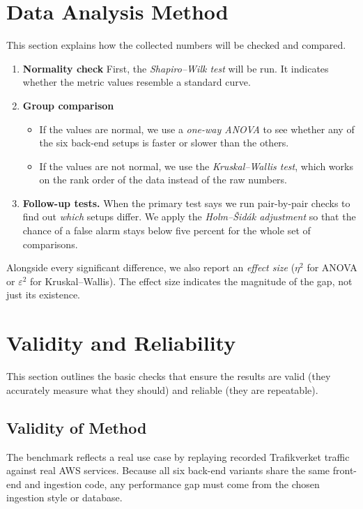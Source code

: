 \documentclass[nomenclature, english, biblatex]{kththesis}
\numberwithin{listing}{chapter}
\begin{document}
\section{Data Analysis Method}
\label{sec:analysis}

This section explains how the collected numbers will be
checked and compared.

\begin{enumerate}[label=\arabic*., leftmargin=*]
  \item \textbf{Normality check}
        First, the \emph{Shapiro–Wilk test} will be run.
        It indicates whether the metric values resemble a standard curve.

  \item \textbf{Group comparison}
        \begin{itemize}[leftmargin=*]
          \item If the values are normal, we use a \emph{one-way ANOVA}
                to see whether any of the six back-end setups is faster or slower than the others.
          \item If the values are not normal, we use the
                \emph{Kruskal–Wallis test}, which works on the rank order of the data instead of the raw numbers.
        \end{itemize}

  \item \textbf{Follow-up tests.}
        When the primary test says  we run pair-by-pair checks to find out \emph{which} setups differ.
        We apply the \emph{Holm–Šidák adjustment} so that the chance of a false alarm stays below five percent for the whole set of comparisons.
\end{enumerate}

\noindent
Alongside every significant difference, we also report an \emph{effect size}
($\eta^{2}$ for ANOVA or $\varepsilon^{2}$ for Kruskal–Wallis). 
The effect size indicates the magnitude of the gap, not just its existence.



\section{Validity and Reliability}
\label{sec:validity}

This section outlines the basic checks that ensure the results are valid (they accurately measure what they should) and reliable (they are repeatable).

\subsection{Validity of Method}
The benchmark reflects a real use case by replaying recorded Trafikverket traffic against real AWS services.
Because all six back-end variants share the same front-end and ingestion code, any performance gap must come from the chosen ingestion style or database.
\end{document}
